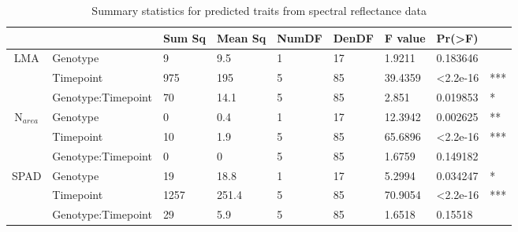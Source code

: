 \documentclass{article}
\begin{document}
\begin{table}[ht]
	\centering
	\caption{Summary statistics for predicted traits from spectral
		reflectance data}
	\label{field_spec_table}
	\begin{adjustbox}
		{width=\textwidth}
		\begin{tabular}{@{}cllllllll@{}}
			\toprule                                          &                    & \textbf{Sum Sq} & \textbf{Mean Sq} & \textbf{NumDF} & \textbf{DenDF} & \textbf{F value} & \textbf{Pr(\textgreater{}F)} &     \\
			\midrule \multirow{3}{*}{LMA}                     & Genotype           & 9               & 9.5              & 1              & 17             & 1.9211           & 0.183646                     &     \\
			                                                  & Timepoint          & 975             & 195              & 5              & 85             & 39.4359          & \textless 2.2e-16            & *** \\
			                                                  & Genotype:Timepoint & 70              & 14.1             & 5              & 85             & 2.851            & 0.019853                     & *   \\
			\midrule \multirow{3}{*}{N$_{area}$}              & Genotype           & 0               & 0.4              & 1              & 17             & 12.3942          & 0.002625                     & **  \\
			                                                  & Timepoint          & 10              & 1.9              & 5              & 85             & 65.6896          & \textless 2.2e-16            & *** \\
			                                                  & Genotype:Timepoint & 0               & 0                & 5              & 85             & 1.6759           & 0.149182                     &     \\
			\midrule \multirow{3}{*}{SPAD}                    & Genotype           & 19              & 18.8             & 1              & 17             & 5.2994           & 0.034247                     & *   \\
			                                                  & Timepoint          & 1257            & 251.4            & 5              & 85             & 70.9054          & \textless 2.2e-16            & *** \\
			                                                  & Genotype:Timepoint & 29              & 5.9              & 5              & 85             & 1.6518           & 0.15518                      &     \\

\end{tabular}
\end{adjustbox}
\end{table}
\end{document}
